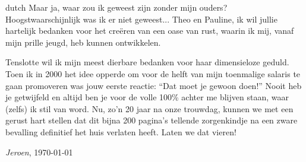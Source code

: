 \begin{otherlanguage*}{dutch}
Maar ja, waar zou ik geweest zijn zonder mijn ouders? Hoogstwaarschijnlijk was ik er niet geweest... Theo en Pauline, ik wil jullie hartelijk bedanken voor het cre\"{e}ren van een oase van rust, waarin ik mij, vanaf mijn prille jeugd, heb kunnen ontwikkelen.

Tenslotte wil ik mijn meest dierbare bedanken voor haar dimensieloze geduld. Toen ik in 2000 het idee opperde om voor de helft van mijn toenmalige salaris te gaan promoveren was jouw eerste reactie: ``Dat moet je gewoon doen!'' Nooit heb je getwijfeld en altijd ben je voor de volle 100\% achter me blijven staan, waar (zelfs) ik stil van word. Nu, zo'n 20 jaar na onze trouwdag, kunnen we met een gerust hart stellen dat dit bijna 200 pagina's tellende zorgenkindje na een zware bevalling definitief het huis verlaten heeft. Laten we dat vieren!

\hfill \textit{Jeroen}, \today
\end{otherlanguage*}

